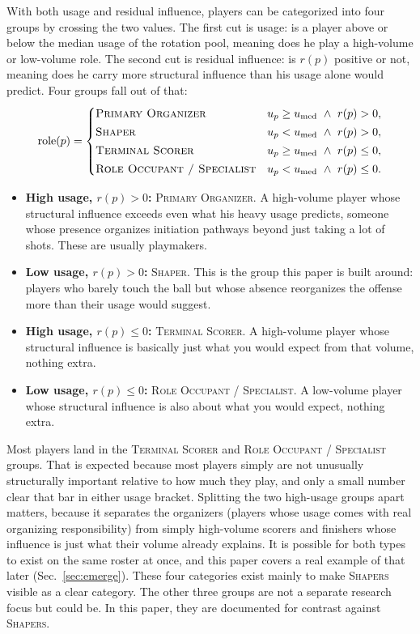 \documentclass[11pt]{article}
\newcommand{\resid}{\ensuremath{r}} %
\begin{document}
With both usage and residual influence, players can be categorized into four groups by
crossing the two values. The first cut is usage: is a player above or below the median usage
of the rotation pool, meaning does he play a high-volume or low-volume role. The second cut is
residual influence: is $\resid(p)$ positive or not, meaning does he carry more structural
influence than his usage alone would predict.
Four groups fall out of that:
\begin{equation}
\label{eq:taxonomy}
\text{role}(p)=
\begin{cases}
\textsc{Primary Organizer} & u_p\ge u_{\text{med}} \ \wedge\ \resid(p)> 0,\\[2pt]
\textsc{Shaper} & u_p< u_{\text{med}} \ \wedge\ \resid(p)> 0,\\[2pt]
\textsc{Terminal Scorer} & u_p\ge u_{\text{med}} \ \wedge\ \resid(p)\le 0,\\[2pt]
\textsc{Role Occupant / Specialist} & u_p< u_{\text{med}} \ \wedge\ \resid(p)\le 0.
\end{cases}
\end{equation}
\begin{itemize}[leftmargin=1.4em,itemsep=0.15em]
 \item \textbf{High usage, $\resid(p)>0$:} \textsc{Primary Organizer}. A high-volume player
 whose structural influence exceeds even what his heavy usage predicts, someone whose
 presence organizes initiation pathways beyond just taking a lot of shots. These are usually
 playmakers.
 \item \textbf{Low usage, $\resid(p)>0$:} \textsc{Shaper}. This is the group this paper is
 built around: players who barely touch the ball but whose absence reorganizes the offense
 more than their usage would suggest.
 \item \textbf{High usage, $\resid(p)\le 0$:} \textsc{Terminal Scorer}. A high-volume player
 whose structural influence is basically just what you would expect from that volume, nothing
 extra.
 \item \textbf{Low usage, $\resid(p)\le 0$:} \textsc{Role Occupant / Specialist}. A low-volume
 player whose structural influence is also about what you would expect, nothing extra.
\end{itemize}
Most players land in the \textsc{Terminal Scorer} and \textsc{Role Occupant / Specialist}
groups. That is expected because most players simply are not unusually structurally important
relative to how much they play, and only a small number clear that bar in either usage
bracket.
Splitting the two high-usage groups apart matters, because it separates the organizers
(players whose usage comes with real organizing responsibility) from simply high-volume
scorers and finishers whose influence is just what their volume already explains. It is
possible for both types to exist on the same roster at once, and this paper covers a real
example of that later (Sec.~\ref{sec:emerge}).
These four categories exist mainly to make \textsc{Shapers} visible as a clear category. The
other three groups are not a separate research focus but could be. In this paper, they are
documented for contrast against \textsc{Shapers}.
\end{document}
